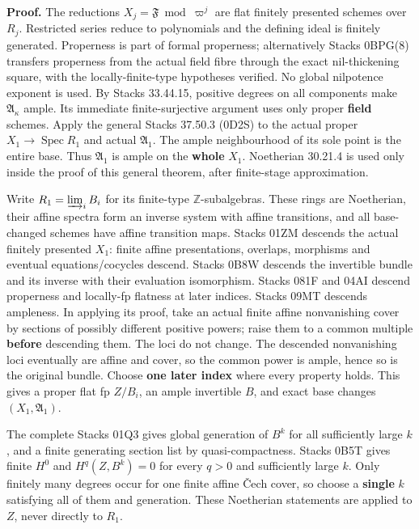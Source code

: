 \documentclass[
  11pt,
]{article}
\begin{document}
\textbf{Proof.} The reductions \(X_j=\mathfrak F\bmod\varpi^j\) are flat
finitely presented schemes over \(R_j\). Restricted series reduce to
polynomials and the defining ideal is finitely generated. Properness is
part of formal properness; alternatively Stacks 0BPG(8) transfers
properness from the actual field fibre through the exact nil-thickening
square, with the locally-finite-type hypotheses verified. No global
nilpotence exponent is used. By Stacks 33.44.15, positive degrees on all
components make \(\mathfrak A_\kappa\) ample. Its immediate
finite-surjective argument uses only proper \textbf{field} schemes.
Apply the general Stacks 37.50.3 (0D2S) to the actual proper
\(X_1\to\operatorname{Spec}R_1\) and actual \(\mathfrak A_1\). The ample
neighbourhood of its sole point is the entire base. Thus
\(\mathfrak A_1\) is ample on the \textbf{whole} \(X_1\). Noetherian
30.21.4 is used only inside the proof of this general theorem, after
finite-stage approximation.

Write \(R_1=\varinjlim_i B_i\) for its finite-type
\(\mathbb Z\)-subalgebras. These rings are Noetherian, their affine
spectra form an inverse system with affine transitions, and all
base-changed schemes have affine transition maps. Stacks 01ZM descends
the actual finitely presented \(X_1\): finite affine presentations,
overlaps, morphisms and eventual equations/cocycles descend. Stacks 0B8W
descends the invertible bundle and its inverse with their evaluation
isomorphism. Stacks 081F and 04AI descend properness and locally-fp
flatness at later indices. Stacks 09MT descends ampleness. In applying
its proof, take an actual finite affine nonvanishing cover by sections
of possibly different positive powers; raise them to a common multiple
\textbf{before} descending them. The loci do not change. The descended
nonvanishing loci eventually are affine and cover, so the common power
is ample, hence so is the original bundle. Choose \textbf{one later
index} where every property holds. This gives a proper flat fp
\(Z/B_i\), an ample invertible \(B\), and exact base changes
\((X_1,\mathfrak A_1)\).

The complete Stacks 01Q3 gives global generation of \(B^k\) for all
sufficiently large \(k\), and a finite generating section list by
quasi-compactness. Stacks 0B5T gives finite \(H^0\) and \(H^q(Z,B^k)=0\)
for every \(q>0\) and sufficiently large \(k\). Only finitely many
degrees occur for one finite affine Čech cover, so choose a
\textbf{single} \(k\) satisfying all of them and generation. These
Noetherian statements are applied to \(Z\), never directly to \(R_1\).
\end{document}

